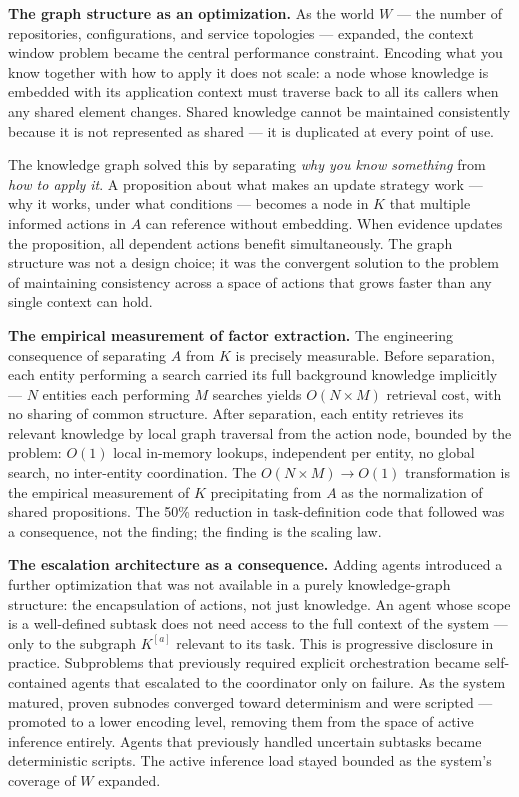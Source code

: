 \documentclass[
]{article}
\begin{document}
\textbf{The graph structure as an optimization.} As the world \(W\) ---
the number of repositories, configurations, and service topologies ---
expanded, the context window problem became the central performance
constraint. Encoding what you know together with how to apply it does
not scale: a node whose knowledge is embedded with its application
context must traverse back to all its callers when any shared element
changes. Shared knowledge cannot be maintained consistently because it
is not represented as shared --- it is duplicated at every point of use.

The knowledge graph solved this by separating \emph{why you know
something} from \emph{how to apply it}. A proposition about what makes
an update strategy work --- why it works, under what conditions ---
becomes a node in \(K\) that multiple informed actions in \(A\) can
reference without embedding. When evidence updates the proposition, all
dependent actions benefit simultaneously. The graph structure was not a
design choice; it was the convergent solution to the problem of
maintaining consistency across a space of actions that grows faster than
any single context can hold.

\textbf{The empirical measurement of factor extraction.} The engineering
consequence of separating \(A\) from \(K\) is precisely measurable.
Before separation, each entity performing a search carried its full
background knowledge implicitly --- \(N\) entities each performing \(M\)
searches yields \(O(N \times M)\) retrieval cost, with no sharing of
common structure. After separation, each entity retrieves its relevant
knowledge by local graph traversal from the action node, bounded by the
problem: \(O(1)\) local in-memory lookups, independent per entity, no
global search, no inter-entity coordination. The
\(O(N \times M) \to O(1)\) transformation is the empirical measurement
of \(K\) precipitating from \(A\) as the normalization of shared
propositions. The 50\% reduction in task-definition code that followed
was a consequence, not the finding; the finding is the scaling law.

\textbf{The escalation architecture as a consequence.} Adding agents
introduced a further optimization that was not available in a purely
knowledge-graph structure: the encapsulation of actions, not just
knowledge. An agent whose scope is a well-defined subtask does not need
access to the full context of the system --- only to the subgraph
\(K^{[a]}\) relevant to its task. This is progressive disclosure in
practice. Subproblems that previously required explicit orchestration
became self-contained agents that escalated to the coordinator only on
failure. As the system matured, proven subnodes converged toward
determinism and were scripted --- promoted to a lower encoding level,
removing them from the space of active inference entirely. Agents that
previously handled uncertain subtasks became deterministic scripts. The
active inference load stayed bounded as the system's coverage of \(W\)
expanded.
\end{document}
